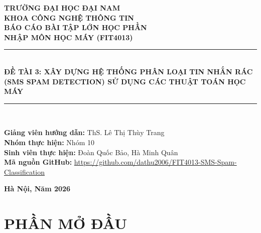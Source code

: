 \documentclass[12pt,a4paper]{report}
\begin{document}
\begin{titlepage}
    \thispagestyle{empty}
    \centering
    \textbf{\fontsize{14pt}{18pt}\selectfont TRƯỜNG ĐẠI HỌC ĐẠI NAM}\\
    \textbf{\fontsize{14pt}{18pt}\selectfont KHOA CÔNG NGHỆ THÔNG TIN}\\[2.2cm]
    
    \textbf{\fontsize{15pt}{20pt}\selectfont BÁO CÁO BÀI TẬP LỚN HỌC PHẦN}\\
    \textbf{\fontsize{16pt}{22pt}\selectfont NHẬP MÔN HỌC MÁY (FIT4013)}\\[1.2cm]
    
    \rule{\linewidth}{0.6mm}\\[0.5cm]
    {\fontsize{17pt}{24pt}\selectfont \textbf{ĐỀ TÀI 3: XÂY DỰNG HỆ THỐNG PHÂN LOẠI TIN NHẮN RÁC (SMS SPAM DETECTION) SỬ DỤNG CÁC THUẬT TOÁN HỌC MÁY}}\\[0.3cm]
    \rule{\linewidth}{0.6mm}\\[2.2cm]
    
    \begin{flushleft}
        \large
        \textbf{Giảng viên hướng dẫn:} ThS. Lê Thị Thùy Trang\\[0.3cm]
        \textbf{Nhóm thực hiện:} Nhóm 10\\[0.3cm]
        \textbf{Sinh viên thực hiện:} Đoàn Quốc Bảo, Hà Minh Quân\\[0.3cm]
        \textbf{Mã nguồn GitHub:} \url{https://github.com/dathu2006/FIT4013-SMS-Spam-Classification}
    \end{flushleft}
    
    \vfill
    {\fontsize{13pt}{18pt}\selectfont \textbf{Hà Nội, Năm 2026}}
\end{titlepage}

\tableofcontents
\newpage
\listoffigures
\listoftables
\newpage

\setcounter{page}{1}

\chapter*{PHẦN MỞ ĐẦU}
\end{document}

